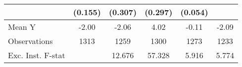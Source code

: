 {\begin{tabular}{l*{5}{c}}
            &     (0.155)         &     (0.307)         &     (0.297)         &     (0.054)         &                     \\
\midrule
Mean Y      &       -2.00         &       -2.06         &        4.02         &       -0.11         &       -2.09         \\
Observations&        1313         &        1259         &        1300         &        1273         &        1233         \\
Exc. Inst. F-stat&                     &      12.676         &      57.328         &       5.916         &       5.774         \\
\bottomrule
\end{tabular}
}
